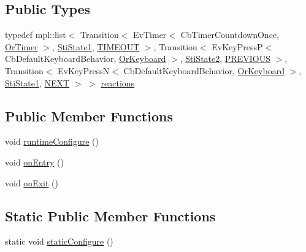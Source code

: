 \subsection*{Public Types}
\begin{DoxyCompactItemize}
\item 
typedef mpl\+::list$<$ Transition$<$ Ev\+Timer$<$ Cb\+Timer\+Countdown\+Once, \hyperlink{classsm__ferrari_1_1OrTimer}{Or\+Timer} $>$, \hyperlink{structsm__ferrari_1_1inner__states_1_1StiState1}{Sti\+State1}, \hyperlink{structsm__ferrari_1_1inner__states_1_1StiState3_1_1TIMEOUT}{T\+I\+M\+E\+O\+UT} $>$, Transition$<$ Ev\+Key\+PressP$<$ Cb\+Default\+Keyboard\+Behavior, \hyperlink{classsm__ferrari_1_1OrKeyboard}{Or\+Keyboard} $>$, \hyperlink{structsm__ferrari_1_1inner__states_1_1StiState2}{Sti\+State2}, \hyperlink{structsm__ferrari_1_1inner__states_1_1StiState3_1_1PREVIOUS}{P\+R\+E\+V\+I\+O\+US} $>$, Transition$<$ Ev\+Key\+PressN$<$ Cb\+Default\+Keyboard\+Behavior, \hyperlink{classsm__ferrari_1_1OrKeyboard}{Or\+Keyboard} $>$, \hyperlink{structsm__ferrari_1_1inner__states_1_1StiState1}{Sti\+State1}, \hyperlink{structsm__ferrari_1_1inner__states_1_1StiState3_1_1NEXT}{N\+E\+XT} $>$ $>$ \hyperlink{structsm__ferrari_1_1inner__states_1_1StiState3_a885d0bd3d29fc16872ecdeb1c7bd1ed1}{reactions}
\end{DoxyCompactItemize}
\subsection*{Public Member Functions}
\begin{DoxyCompactItemize}
\item 
void \hyperlink{structsm__ferrari_1_1inner__states_1_1StiState3_a1f63c011c0946341d4b0d8dd9c969a1e}{runtime\+Configure} ()
\item 
void \hyperlink{structsm__ferrari_1_1inner__states_1_1StiState3_a44e7047d2e734c328b28b4a9ce668d44}{on\+Entry} ()
\item 
void \hyperlink{structsm__ferrari_1_1inner__states_1_1StiState3_a9f4830bb4bf3b5cf257f92a926869cb6}{on\+Exit} ()
\end{DoxyCompactItemize}
\subsection*{Static Public Member Functions}
\begin{DoxyCompactItemize}
\item 
static void \hyperlink{structsm__ferrari_1_1inner__states_1_1StiState3_a7c4d0a2a44d3460a1fe66defbd1c4770}{static\+Configure} ()
\end{DoxyCompactItemize}
